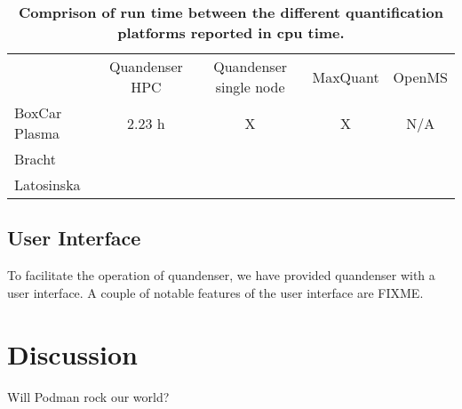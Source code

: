 \documentclass[11pt]{article}
\begin{document}
\begin{table}
  \caption{{\bf Comprison of run time between the different quantification platforms reported in cpu time.}}
  \label{table:cputime}
\begin{tabular}{lcccc}
& Quandenser HPC & Quandenser single node & MaxQuant & OpenMS \\
BoxCar Plasma & 2.23 h & X & X & N/A \\
Bracht &  & &&  \\
Latosinska & &&& \\
\end{tabular}

\end{table}


\subsection*{User Interface}

To facilitate the operation of quandenser, we have provided quandenser with a user interface. A couple of notable features of the user interface are FIXME.

\section*{Discussion}

Will Podman rock our world?



\end{document}
